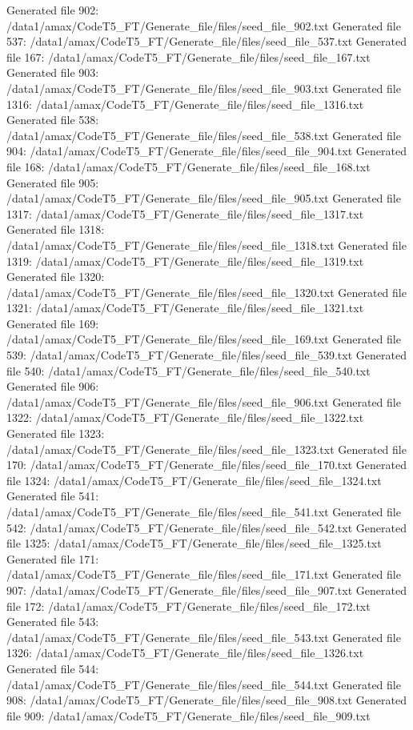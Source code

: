Generated file 902: /data1/amax/CodeT5_FT/Generate_file/files/seed_file_902.txt
Generated file 537: /data1/amax/CodeT5_FT/Generate_file/files/seed_file_537.txt
Generated file 167: /data1/amax/CodeT5_FT/Generate_file/files/seed_file_167.txt
Generated file 903: /data1/amax/CodeT5_FT/Generate_file/files/seed_file_903.txt
Generated file 1316: /data1/amax/CodeT5_FT/Generate_file/files/seed_file_1316.txt
Generated file 538: /data1/amax/CodeT5_FT/Generate_file/files/seed_file_538.txt
Generated file 904: /data1/amax/CodeT5_FT/Generate_file/files/seed_file_904.txt
Generated file 168: /data1/amax/CodeT5_FT/Generate_file/files/seed_file_168.txt
Generated file 905: /data1/amax/CodeT5_FT/Generate_file/files/seed_file_905.txt
Generated file 1317: /data1/amax/CodeT5_FT/Generate_file/files/seed_file_1317.txt
Generated file 1318: /data1/amax/CodeT5_FT/Generate_file/files/seed_file_1318.txt
Generated file 1319: /data1/amax/CodeT5_FT/Generate_file/files/seed_file_1319.txt
Generated file 1320: /data1/amax/CodeT5_FT/Generate_file/files/seed_file_1320.txt
Generated file 1321: /data1/amax/CodeT5_FT/Generate_file/files/seed_file_1321.txt
Generated file 169: /data1/amax/CodeT5_FT/Generate_file/files/seed_file_169.txt
Generated file 539: /data1/amax/CodeT5_FT/Generate_file/files/seed_file_539.txt
Generated file 540: /data1/amax/CodeT5_FT/Generate_file/files/seed_file_540.txt
Generated file 906: /data1/amax/CodeT5_FT/Generate_file/files/seed_file_906.txt
Generated file 1322: /data1/amax/CodeT5_FT/Generate_file/files/seed_file_1322.txt
Generated file 1323: /data1/amax/CodeT5_FT/Generate_file/files/seed_file_1323.txt
Generated file 170: /data1/amax/CodeT5_FT/Generate_file/files/seed_file_170.txt
Generated file 1324: /data1/amax/CodeT5_FT/Generate_file/files/seed_file_1324.txt
Generated file 541: /data1/amax/CodeT5_FT/Generate_file/files/seed_file_541.txt
Generated file 542: /data1/amax/CodeT5_FT/Generate_file/files/seed_file_542.txt
Generated file 1325: /data1/amax/CodeT5_FT/Generate_file/files/seed_file_1325.txt
Generated file 171: /data1/amax/CodeT5_FT/Generate_file/files/seed_file_171.txt
Generated file 907: /data1/amax/CodeT5_FT/Generate_file/files/seed_file_907.txt
Generated file 172: /data1/amax/CodeT5_FT/Generate_file/files/seed_file_172.txt
Generated file 543: /data1/amax/CodeT5_FT/Generate_file/files/seed_file_543.txt
Generated file 1326: /data1/amax/CodeT5_FT/Generate_file/files/seed_file_1326.txt
Generated file 544: /data1/amax/CodeT5_FT/Generate_file/files/seed_file_544.txt
Generated file 908: /data1/amax/CodeT5_FT/Generate_file/files/seed_file_908.txt
Generated file 909: /data1/amax/CodeT5_FT/Generate_file/files/seed_file_909.txt
